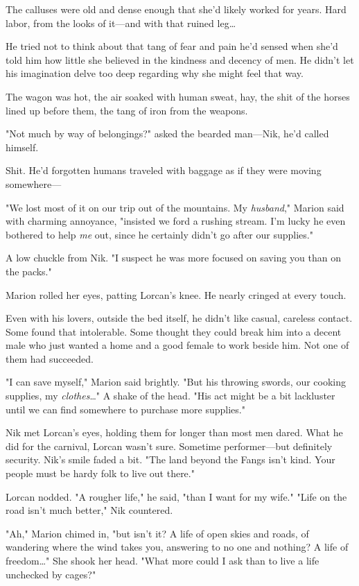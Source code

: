 The calluses were old and dense enough that she'd likely worked for years. Hard labor, from the looks of it---and with that ruined leg\ldots{}

He tried not to think about that tang of fear and pain he'd sensed when she'd told him how little she believed in the kindness and decency of men. He didn't let his imagination delve too deep regarding why she might feel that way.

The wagon was hot, the air soaked with human sweat, hay, the shit of the horses lined up before them, the tang of iron from the weapons.

"Not much by way of belongings?" asked the bearded man---Nik, he'd called himself.

Shit. He'd forgotten humans traveled with baggage as if they were moving somewhere---

"We lost most of it on our trip out of the mountains. My
\emph{husband}," Marion said with charming annoyance, "insisted we ford a rushing stream. I'm lucky he even bothered to help \emph{me} out, since he certainly didn't go after our supplies."

A low chuckle from Nik. "I suspect he was more focused on saving you than on the packs."

Marion rolled her eyes, patting Lorcan's knee. He nearly cringed at every touch.

Even with his lovers, outside the bed itself, he didn't like casual, careless contact. Some found that intolerable. Some thought they could break him into a decent male who just wanted a home and a good female to work beside him. Not one of them had succeeded.

"I can save myself," Marion said brightly. "But his throwing swords, our cooking supplies, my \emph{clothes}\ldots" A shake of the head. "His act might be a bit lackluster until we can find somewhere to purchase more supplies."

Nik met Lorcan's eyes, holding them for longer than most men dared. What he did for the carnival, Lorcan wasn't sure. Sometime performer---but definitely security. Nik's smile faded a bit. "The land beyond the Fangs isn't kind. Your people must be hardy folk to live out there."

Lorcan nodded. "A rougher life," he said, "than I want for my wife." "Life on the road isn't much better," Nik countered.

"Ah," Marion chimed in, "but isn't it? A life of open skies and roads, of wandering where the wind takes you, answering to no one and nothing? A life of freedom\ldots" She shook her head. "What more could I ask than to live a life unchecked by cages?"

